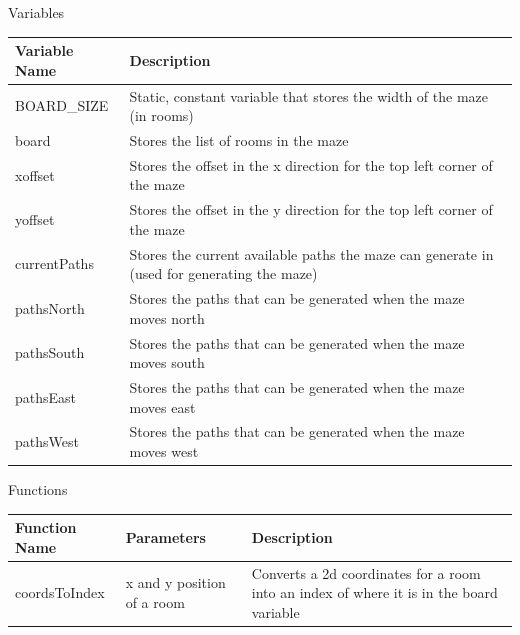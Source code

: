 \documentclass{article}
\begin{document}
                \begin{center}
                    Variables
                    \begin{tabular}{ | m{} | m{} | }
                        \hline
                        \textbf{Variable Name} & \textbf{Description} \\
                        \hline
                        BOARD\_SIZE & Static, constant variable that stores the width of the maze (in rooms) \\
                        \hline
                        board & Stores the list of rooms in the maze \\
                        \hline
                        xoffset & Stores the offset in the x direction for the top left corner of the maze \\
                        \hline
                        yoffset & Stores the offset in the y direction for the top left corner of the maze \\
                        \hline
                        currentPaths & Stores the current available paths the maze can generate in (used for generating the maze)\\
                        \hline
                        pathsNorth & Stores the paths that can be generated when the maze moves north \\
                        \hline
                        pathsSouth & Stores the paths that can be generated when the maze moves south \\
                        \hline
                        pathsEast & Stores the paths that can be generated when the maze moves east \\
                        \hline
                        pathsWest & Stores the paths that can be generated when the maze moves west \\
                        \hline
                    \end{tabular}
                    Functions
                    \begin{tabular}{ | m{} | m{}| m{} | }
                        \hline
                        \textbf{Function Name} & \textbf{Parameters} & \textbf{Description} \\
                        \hline
                        coordsToIndex & x and y position of a room & Converts a 2d coordinates for a room into an index of where it is in the board variable \\

\end{tabular}
\end{center}
\end{document}
